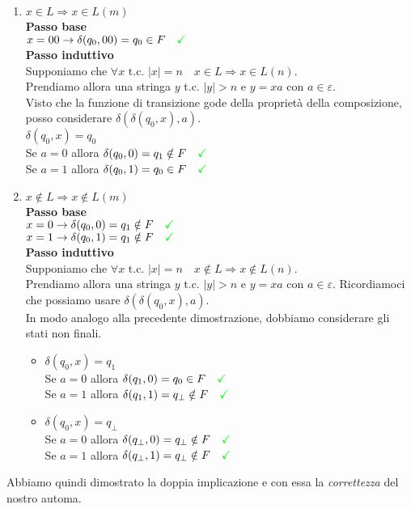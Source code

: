 \documentclass[a4paper,oneside]{scrbook}
\newcommand{\greenmark}{\quad \textcolor{green}{\checkmark}}
\begin{document}
\begin{enumerate}
	\item $x\in L \Rightarrow x \in L(m)$\\
	\textbf{Passo base}\\
	$ x=00 \rightarrow \delta(q_0,00)=q_0 \in F \greenmark $\\
	\textbf{Passo induttivo}\\
	Supponiamo che $\forall x \text{ t.c. } |x|=n \quad x \in L \Rightarrow x\in L(n)$.\\
	Prendiamo allora una stringa $y$ t.c. $|y|>n$ e $y=xa \text{ con }a\in\varepsilon$.\\
	Visto che la funzione di transizione gode della proprietà della composizione, posso considerare $\delta(\delta(q_0,x),a)$.\\
	$\delta(q_0,x)=q_0$\\
	Se $a=0$ allora $\delta(q_0,0)=q_1 \notin F \greenmark$\\
	Se $a=1$ allora $\delta(q_0,1)=q_0 \in F \greenmark$
	
	\item $x\notin L \Rightarrow x \notin L(m)$\\
	\textbf{Passo base}\\
	$x=0 \rightarrow \delta(q_0,0)=q_1 \notin F \greenmark$\\
	$x=1 \rightarrow \delta(q_0,1)=q_1 \notin F \greenmark$\\
	\textbf{Passo induttivo}\\
	Supponiamo che $\forall x \text{ t.c. } |x|=n \quad x \notin L \Rightarrow x\notin L(n)$.\\
	Prendiamo allora una stringa $y$ t.c. $|y|>n$ e $y=xa \text{ con }a\in\varepsilon$. Ricordiamoci che possiamo usare $\delta(\delta(q_0,x),a)$.\\
	In modo analogo alla precedente dimostrazione, dobbiamo considerare gli stati non finali.
	\begin{itemize}
		\item $\delta(q_0,x)=q_1$\\
		Se $a=0$ allora $\delta(q_1,0)=q_0 \in F \greenmark$\\
		Se $a=1$ allora $\delta(q_1,1)=q_\bot \notin F \greenmark$
		\item $\delta(q_0,x)=q_\bot$\\
		Se $a=0$ allora $\delta(q_\bot,0)=q_\bot \notin F \greenmark$\\
		Se $a=1$ allora $\delta(q_\bot,1)=q_\bot \notin F \greenmark$
	\end{itemize}
\end{enumerate}
Abbiamo quindi dimostrato la doppia implicazione e con essa la \textit{correttezza} del nostro automa.
\end{document}
